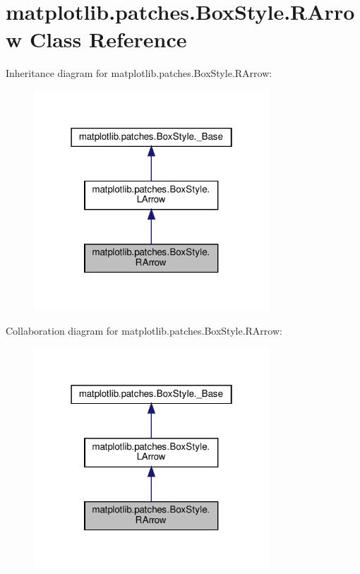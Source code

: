 \hypertarget{classmatplotlib_1_1patches_1_1BoxStyle_1_1RArrow}{}\section{matplotlib.\+patches.\+Box\+Style.\+R\+Arrow Class Reference}
\label{classmatplotlib_1_1patches_1_1BoxStyle_1_1RArrow}


Inheritance diagram for matplotlib.\+patches.\+Box\+Style.\+R\+Arrow\+:
\nopagebreak
\begin{figure}[H]
\begin{center}
\leavevmode
\includegraphics[width=250pt]{classmatplotlib_1_1patches_1_1BoxStyle_1_1RArrow__inherit__graph}
\end{center}
\end{figure}


Collaboration diagram for matplotlib.\+patches.\+Box\+Style.\+R\+Arrow\+:
\nopagebreak
\begin{figure}[H]
\begin{center}
\leavevmode
\includegraphics[width=250pt]{classmatplotlib_1_1patches_1_1BoxStyle_1_1RArrow__coll__graph}
\end{center}
\end{figure}
